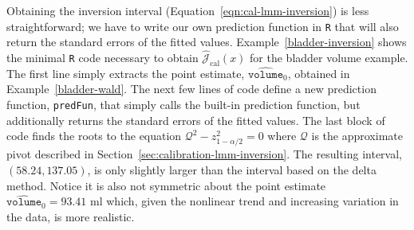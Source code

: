 \documentclass[cmfont,usenames,dvipsnames,leqno]{afit-etd}\usepackage[]{graphicx}\usepackage[]{color}
\newcommand{\code}[1]{\texttt{\small{#1}}}
\newcommand{\mc}[1]{\ensuremath{\mathcal{#1}}}
\newcommand{\wh}[1]{\ensuremath{\widehat{#1}}}
\begin{document}
Obtaining the inversion interval (Equation~\eqref{eqn:cal-lmm-inversion}) is less straightforward; we have to write our own prediction function in \code{R} that will also return the standard errors of the fitted values. Example~\ref{bladder-inversion} shows the minimal \code{R} code necessary to obtain $\wh{\mc{J}}_\mathrm{cal}(x)$ for the bladder volume example. The first line simply extracts the point estimate, $\wh{\texttt{volume}}_0$, obtained in Example~\ref{bladder-wald}. The next few lines of code define a new prediction function, \code{predFun}, that simply calls the built-in prediction function, but additionally returns the standard errors of the fitted values. The last block of code finds the roots to the equation $\mc{Q}^2 - z_{1-\alpha/2}^2 = 0$ where $\mc{Q}$ is the approximate pivot described in Section~\ref{sec:calibration-lmm-inversion}. The resulting interval, $(58.24, 137.05)$, is only slightly larger than the interval based on the delta method. Notice it is also not symmetric about the point estimate $\wh{\texttt{volume}}_0 = 93.41 \text{ ml}$ which, given the nonlinear trend and increasing variation in the data, is more realistic. 
\end{document}
